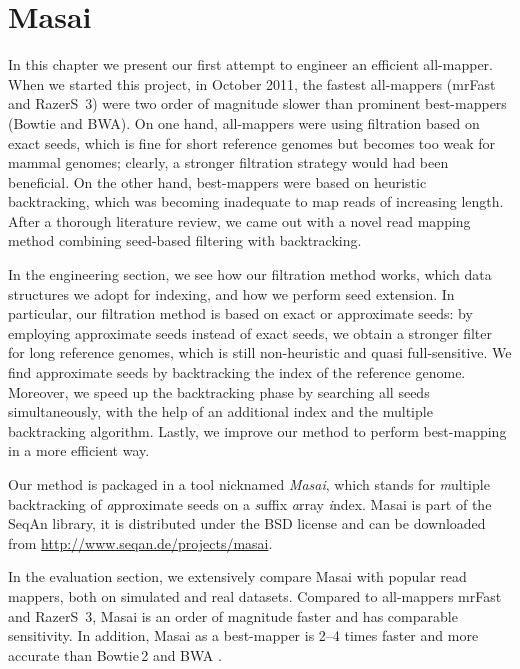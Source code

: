 
\chapter{Masai}

In this chapter we present our first attempt to engineer an efficient all-mapper.
When we started this project, in October 2011, the fastest all-mappers (mrFast and RazerS~3) were two order of magnitude slower than prominent best-mappers (Bowtie and BWA).
On one hand, all-mappers were using filtration based on exact seeds, which is fine for short reference genomes but becomes too weak for mammal genomes; clearly, a stronger filtration strategy would had been beneficial.
On the other hand, best-mappers were based on heuristic backtracking, which was becoming inadequate to map reads of increasing length.
After a thorough literature review, we came out with a novel read mapping method combining seed-based filtering with backtracking.

In the engineering section, we see how our filtration method works, which data structures we adopt for indexing, and how we perform seed extension.
In particular, our filtration method is based on exact or approximate seeds: by employing approximate seeds instead of exact seeds, we obtain a stronger filter for long reference genomes, which is still non-heuristic and quasi full-sensitive.
We find approximate seeds by backtracking the index of the reference genome.
Moreover, we speed up the backtracking phase by searching all seeds simultaneously, with the help of an additional index and the multiple backtracking algorithm.
Lastly, we improve our method to perform best-mapping in a more efficient way.

Our method is packaged in a \CC tool nicknamed \emph{Masai}, which stands for \emph{m}ultiple backtracking of \emph{a}pproximate seeds on a \emph{s}uffix \emph{a}rray \emph{i}ndex.
Masai is part of the SeqAn library, it is distributed under the BSD license and can be downloaded from \url{http://www.seqan.de/projects/masai}.

In the evaluation section, we extensively compare Masai with popular read mappers, both on simulated and real datasets.
Compared to all-mappers mrFast and RazerS~3, Masai is an order of magnitude faster and has comparable sensitivity.
In addition, Masai as a best-mapper is 2--4 times faster and more accurate than Bowtie\,2 \citep{Bowtie2} and BWA \citep{BWA}.

